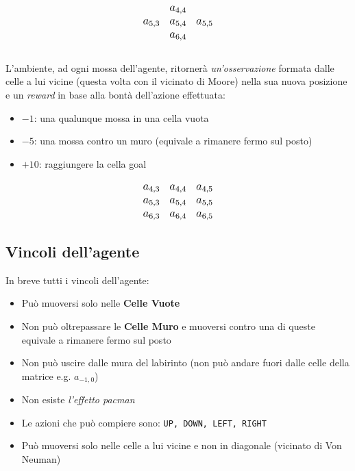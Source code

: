 \begin{equation*}
\large
\begin{matrix}
	\ & a_{4,4} & \ \\
	a_{5,3} & a_{5,4} & a_{5,5}\\
	\ & a_{6,4} & \ \\
\end{matrix}
\end{equation*}
\ \\
L'ambiente, ad ogni mossa dell'agente, ritorner\`{a}  \textit{un'osservazione} formata dalle celle a lui vicine (questa volta con il vicinato di Moore) nella sua nuova posizione e un \textit{reward} in base alla bont\`{a} dell'azione effettuata:

\begin{itemize}
	\item $-1$: una qualunque mossa in una cella vuota
	\item $-5$: una mossa contro un muro (equivale a rimanere fermo sul posto)
	\item $+10$: raggiungere la cella goal
\end{itemize}

\begin{equation*}
	\large
	\begin{matrix}
		a_{ 4,3} & a_{4,4} & a_{4,5} \\
		a_{5,3} & a_{5,4} & a_{5,5}\\
		a_{6,3} & a_{6,4} & a_{6,5} \\
	\end{matrix}
\end{equation*}

\subsection{Vincoli dell'agente}
In breve tutti i vincoli dell'agente:

\begin{itemize}
	\item Pu\`{o} muoversi solo nelle \textbf{Celle Vuote}
	\item Non pu\`{o} oltrepassare le \textbf{Celle Muro} e muoversi contro una di queste equivale a rimanere fermo sul posto
	\item Non pu\`{o} uscire dalle mura del labirinto (non pu\`{o} andare fuori dalle celle della matrice e.g. $a_{-1, 0}$)
	\item Non esiste \textit{l'effetto pacman}
	\item Le azioni che pu\`{o} compiere sono: \lstinline[style=cmd]|UP, DOWN, LEFT, RIGHT|
	\item Pu\`{o} muoversi solo nelle celle a lui vicine e non in diagonale (vicinato di Von Neuman)
\end{itemize}


